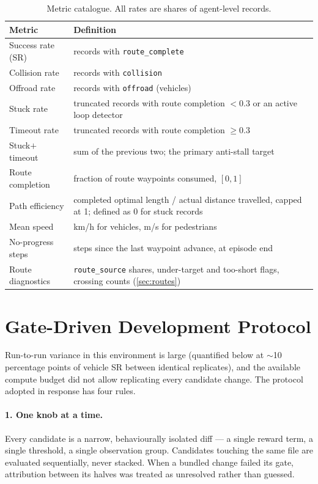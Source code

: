 \begin{table}[t]
  \centering\small
  \caption{Metric catalogue. All rates are shares of agent-level records.}
  \label{tab:metrics}
  \begin{tabular}{@{}p{3.6cm}p{9.6cm}@{}}
    \toprule
    Metric & Definition \\
    \midrule
    Success rate (SR) & records with \texttt{route\_complete} \\
    Collision rate & records with \texttt{collision} \\
    Offroad rate & records with \texttt{offroad} (vehicles) \\
    Stuck rate & truncated records with route completion $< 0.3$ or an active loop detector \\
    Timeout rate & truncated records with route completion $\geq 0.3$ \\
    Stuck$+$timeout & sum of the previous two; the primary anti-stall target \\
    Route completion & fraction of route waypoints consumed, $[0,1]$ \\
    Path efficiency & completed optimal length / actual distance travelled, capped at 1; defined as 0 for stuck records \\
    Mean speed & km/h for vehicles, m/s for pedestrians \\
    No-progress steps & steps since the last waypoint advance, at episode end \\
    Route diagnostics & \texttt{route\_source} shares, under-target and too-short flags, crossing counts (\cref{sec:routes}) \\
    \bottomrule
  \end{tabular}
\end{table}

\section{Gate-Driven Development Protocol}
\label{sec:gate}

Run-to-run variance in this environment is large (quantified below at
$\sim$10 percentage points of vehicle SR between identical replicates),
and the available compute budget did not allow replicating every candidate
change. The protocol adopted in response has four rules.

\paragraph{1. One knob at a time.}
Every candidate is a narrow, behaviourally isolated diff --- a single
reward term, a single threshold, a single observation group. Candidates
touching the same file are evaluated sequentially, never stacked. When a
bundled change failed its gate, attribution between its halves was treated
as unresolved rather than guessed.

